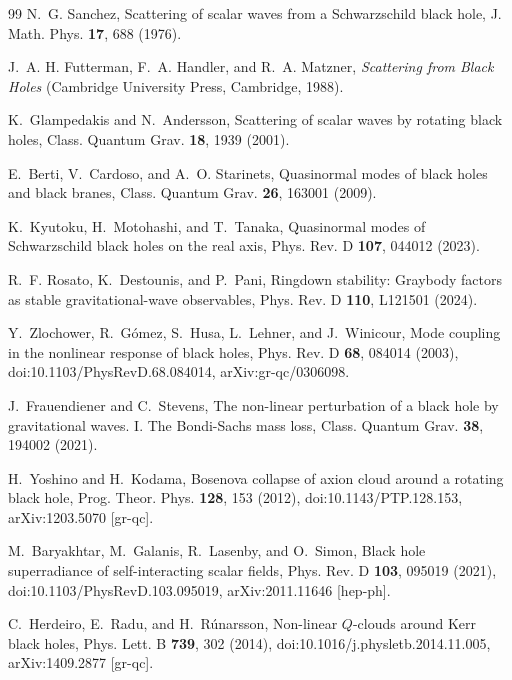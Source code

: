 \documentclass[aps,prd,twocolumn,10pt,nofootinbib,superscriptaddress,floatfix]{revtex4-2}
\begin{document}
\begin{thebibliography}{99}
N.~G. Sanchez,
Scattering of scalar waves from a Schwarzschild black hole,
J. Math. Phys. \textbf{17}, 688 (1976).

J.~A. H. Futterman, F.~A. Handler, and R.~A. Matzner,
\textit{Scattering from Black Holes}
(Cambridge University Press, Cambridge, 1988).

K.~Glampedakis and N.~Andersson,
Scattering of scalar waves by rotating black holes,
Class. Quantum Grav. \textbf{18}, 1939 (2001).

E.~Berti, V.~Cardoso, and A.~O. Starinets,
Quasinormal modes of black holes and black branes,
Class. Quantum Grav. \textbf{26}, 163001 (2009).

K.~Kyutoku, H.~Motohashi, and T.~Tanaka,
Quasinormal modes of Schwarzschild black holes on the real axis,
Phys. Rev. D \textbf{107}, 044012 (2023).

R.~F. Rosato, K.~Destounis, and P.~Pani,
Ringdown stability: Graybody factors as stable gravitational-wave observables,
Phys. Rev. D \textbf{110}, L121501 (2024).

Y.~Zlochower, R.~G\'omez, S.~Husa, L.~Lehner, and J.~Winicour,
Mode coupling in the nonlinear response of black holes,
Phys. Rev. D \textbf{68}, 084014 (2003),
doi:10.1103/PhysRevD.68.084014,
arXiv:gr-qc/0306098.

J.~Frauendiener and C.~Stevens,
The non-linear perturbation of a black hole by gravitational waves. I. The
Bondi-Sachs mass loss,
Class. Quantum Grav. \textbf{38}, 194002 (2021).

H.~Yoshino and H.~Kodama,
Bosenova collapse of axion cloud around a rotating black hole,
Prog. Theor. Phys. \textbf{128}, 153 (2012),
doi:10.1143/PTP.128.153,
arXiv:1203.5070 [gr-qc].

M.~Baryakhtar, M.~Galanis, R.~Lasenby, and O.~Simon,
Black hole superradiance of self-interacting scalar fields,
Phys. Rev. D \textbf{103}, 095019 (2021),
doi:10.1103/PhysRevD.103.095019,
arXiv:2011.11646 [hep-ph].

C.~Herdeiro, E.~Radu, and H.~R\'unarsson,
Non-linear $Q$-clouds around Kerr black holes,
Phys. Lett. B \textbf{739}, 302 (2014),
doi:10.1016/j.physletb.2014.11.005,
arXiv:1409.2877 [gr-qc].


\end{thebibliography}
\end{document}
